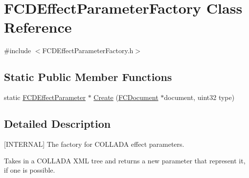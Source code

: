 \hypertarget{classFCDEffectParameterFactory}{
\section{FCDEffectParameterFactory Class Reference}
\label{classFCDEffectParameterFactory}
}


{\ttfamily \#include $<$FCDEffectParameterFactory.h$>$}

\subsection*{Static Public Member Functions}
\begin{DoxyCompactItemize}
\item 
static \hyperlink{classFCDEffectParameter}{FCDEffectParameter} $\ast$ \hyperlink{classFCDEffectParameterFactory_a49f20591f628c8bdf8f8b4b132721e69}{Create} (\hyperlink{classFCDocument}{FCDocument} $\ast$document, uint32 type)
\end{DoxyCompactItemize}


\subsection{Detailed Description}
\mbox{[}INTERNAL\mbox{]} The factory for COLLADA effect parameters.

Takes in a COLLADA XML tree and returns a new parameter that represent it, if one is possible. 

